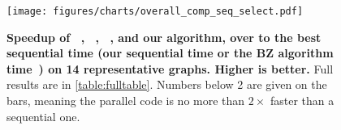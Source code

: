 \begin{figure}[t!]
  \centering
  \texttt{[image: figures/charts/overall\_comp\_seq\_select.pdf]}
  \caption{\small \textbf{Speedup of \ParK~\cite{dasari2014park}, \PKC~\cite{kabir2017parallel}, \Julienne~\cite{dhulipala2017, gbbs2021}, and our algorithm, 
  over to the best sequential time (our sequential time or the BZ algorithm time~\cite{batagelj2003m}) on 14 representative graphs. Higher is better.} 
  Full results are in \cref{table:fulltable}.
  Numbers below 2 are given on the bars, meaning the parallel code is no more than $2\times$ faster than a sequential one.
  }\label{fig:overall_comp_seq}
\end{figure} 